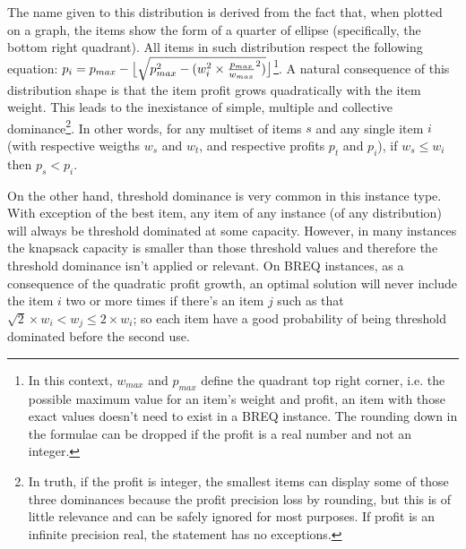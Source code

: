 The name given to this distribution is derived from the fact that, when plotted on a graph, the items show the form of a quarter of ellipse (specifically, the bottom right quadrant). All items in such distribution respect the following equation: \(p_i = p_{max} - \floor[\big]{\sqrt{p_{max}^2 - (w_i^2 \times \frac{p_{max}}{w_{max}}^2)}}\)\footnote{In this context, \(w_{max}\) and \(p_{max}\) define the quadrant top right corner, i.e. the possible maximum value for an item's weight and profit, an item with those exact values doesn't need to exist in a BREQ instance. The rounding down in the formulae can be dropped if the profit is a real number and not an integer.}. A natural consequence of this distribution shape is that the item profit grows quadratically with the item weight. This leads to the inexistance of simple, multiple and collective dominance\footnote{In truth, if the profit is integer, the smallest items can display some of those three dominances because the profit precision loss by rounding, but this is of little relevance and can be safely ignored for most purposes. If profit is an infinite precision real, the statement has no exceptions.}. In other words, for any multiset of items \(s\) and any single item \(i\) (with respective weigths \(w_s\) and \(w_t\), and respective profits \(p_t\) and \(p_i\)), if \(w_s \leq w_i\) then \(p_s < p_i\).

On the other hand, threshold dominance is very common in this instance type. With exception of the best item, any item of any instance (of any distribution) will always be threshold dominated at some capacity. However, in many instances the knapsack capacity is smaller than those threshold values and therefore the threshold dominance isn't applied or relevant. On BREQ instances, as a consequence of the quadratic profit growth, an optimal solution will never include the item \(i\) two or more times if there's an item \(j\) such as that \(\sqrt{2} \times w_i < w_j \leq 2 \times w_i\); so each item have a good probability of being threshold dominated before the second use. 

